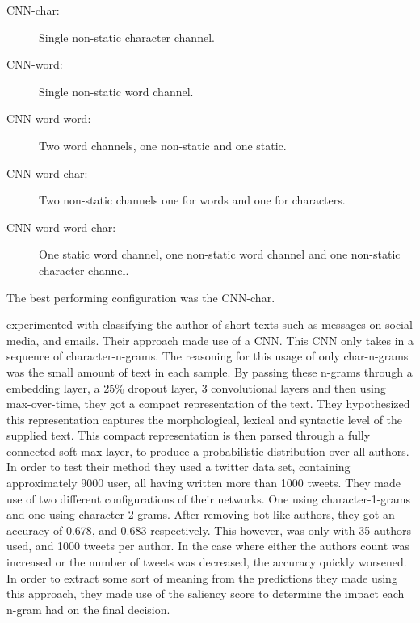 \begin{description}
    \item[CNN-char:] Single non-static character channel.
    \item[CNN-word:] Single non-static word channel.
    \item[CNN-word-word:] Two word channels, one non-static and one static.
    \item[CNN-word-char:] Two non-static channels one for words and one for
        characters.
    \item[CNN-word-word-char:] One static word channel, one non-static word
        channel and one non-static character channel.
\end{description}

The best performing configuration was the CNN-char.

\citet{shrestha2017} experimented with classifying the author of short texts
such as messages on social media, and emails. Their approach made use of a
\gls{CNN}. This \gls{CNN} only takes in a sequence of character-n-grams. The
reasoning for this usage of only char-n-grams was the small amount of text
in each sample. By passing these n-grams through a embedding layer, a 25\%
dropout layer, 3 convolutional layers and then using max-over-time, they got
a compact representation of the text. They hypothesized this representation
captures the morphological, lexical and syntactic level of the supplied text.
This compact representation is then parsed through a fully connected soft-max
layer, to produce a probabilistic distribution over all authors. In order to
test their method they used a twitter data set, containing approximately 9000
user, all having written more than 1000 tweets. They made use of two different
configurations of their networks. One using character-1-grams and one using
character-2-grams. After removing bot-like authors, they got an accuracy of
0.678, and 0.683 respectively. This however, was only with 35 authors used,
and 1000 tweets per author. In the case where either the authors count was
increased or the number of tweets was decreased, the accuracy quickly worsened.
In order to extract some sort of meaning from the predictions they made using
this approach, they made use of the saliency score to determine the impact each
n-gram had on the final decision.

